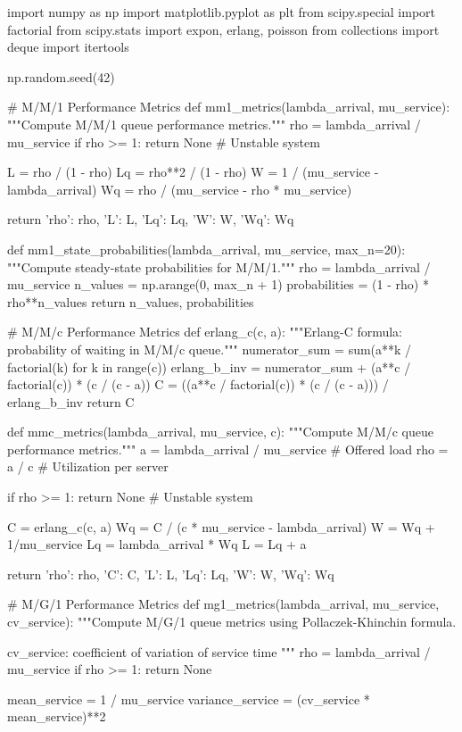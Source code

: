 \documentclass[a4paper, 11pt]{article}
\begin{document}
\begin{pycode}
import numpy as np
import matplotlib.pyplot as plt
from scipy.special import factorial
from scipy.stats import expon, erlang, poisson
from collections import deque
import itertools

np.random.seed(42)

# M/M/1 Performance Metrics
def mm1_metrics(lambda_arrival, mu_service):
    """Compute M/M/1 queue performance metrics."""
    rho = lambda_arrival / mu_service
    if rho >= 1:
        return None  # Unstable system

    L = rho / (1 - rho)
    Lq = rho**2 / (1 - rho)
    W = 1 / (mu_service - lambda_arrival)
    Wq = rho / (mu_service - rho * mu_service)

    return {'rho': rho, 'L': L, 'Lq': Lq, 'W': W, 'Wq': Wq}

def mm1_state_probabilities(lambda_arrival, mu_service, max_n=20):
    """Compute steady-state probabilities for M/M/1."""
    rho = lambda_arrival / mu_service
    n_values = np.arange(0, max_n + 1)
    probabilities = (1 - rho) * rho**n_values
    return n_values, probabilities

# M/M/c Performance Metrics
def erlang_c(c, a):
    """Erlang-C formula: probability of waiting in M/M/c queue."""
    numerator_sum = sum(a**k / factorial(k) for k in range(c))
    erlang_b_inv = numerator_sum + (a**c / factorial(c)) * (c / (c - a))
    C = ((a**c / factorial(c)) * (c / (c - a))) / erlang_b_inv
    return C

def mmc_metrics(lambda_arrival, mu_service, c):
    """Compute M/M/c queue performance metrics."""
    a = lambda_arrival / mu_service  # Offered load
    rho = a / c  # Utilization per server

    if rho >= 1:
        return None  # Unstable system

    C = erlang_c(c, a)
    Wq = C / (c * mu_service - lambda_arrival)
    W = Wq + 1/mu_service
    Lq = lambda_arrival * Wq
    L = Lq + a

    return {'rho': rho, 'C': C, 'L': L, 'Lq': Lq, 'W': W, 'Wq': Wq}

# M/G/1 Performance Metrics
def mg1_metrics(lambda_arrival, mu_service, cv_service):
    """Compute M/G/1 queue metrics using Pollaczek-Khinchin formula.

    cv_service: coefficient of variation of service time
    """
    rho = lambda_arrival / mu_service
    if rho >= 1:
        return None

    mean_service = 1 / mu_service
    variance_service = (cv_service * mean_service)**2


\end{pycode}
\end{document}
